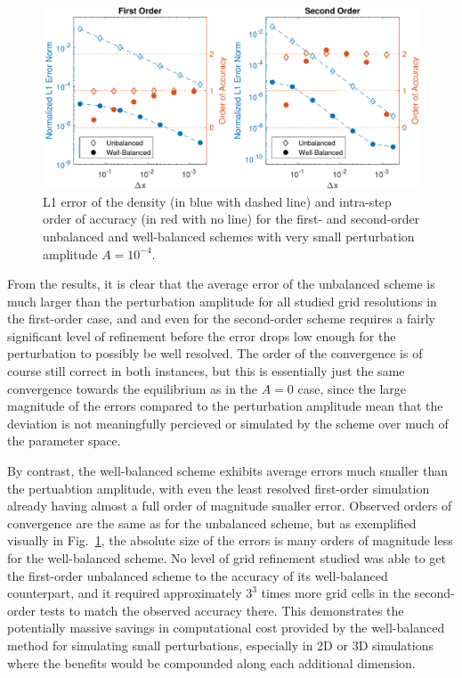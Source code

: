 \begin {figure}
\centering
\includegraphics[width=13cm]{figures/OVSeps0_0001}
\caption {L1 error of the density (in blue with dashed line) and intra-step order of accuracy (in red with no line) for the first- and second-order unbalanced and well-balanced schemes with very small perturbation amplitude $A=10^{-4}$.}
\label{fig:OVS_Asmall}
\end{figure}

From the results, it is clear that the average error of the unbalanced scheme is much larger than the perturbation amplitude for all studied grid resolutions in the first-order case, and and even for the second-order scheme requires a fairly significant level of refinement before the error drops low enough for the perturbation to possibly be well resolved. The order of the convergence is of course still correct in both instances, but this is essentially just the same convergence towards the equilibrium as in the $A=0$ case, since the large magnitude of the errors compared to the perturbation amplitude mean that the deviation is not meaningfully percieved or simulated by the scheme over much of the parameter space.

By contrast, the well-balanced scheme exhibits average errors much smaller than the pertuabtion amplitude, with even the least resolved first-order simulation already having almost a full order of magnitude smaller error. Observed orders of convergence are the same as for the unbalanced scheme, but as exemplified visually in Fig.~\ref{fig:OVS_Asmall}, the absolute size of the errors is many orders of magnitude less for the well-balanced scheme. No level of grid refinement studied was able to get the first-order unbalanced scheme to the accuracy of its well-balanced counterpart, and it required approximately $3^3$ times more grid cells in the second-order tests to match the observed accuracy there. This demonstrates the potentially massive savings in computational cost provided by the well-balanced method for simulating small perturbations, especially in 2D or 3D simulations where the benefits would be compounded along each additional dimension.

